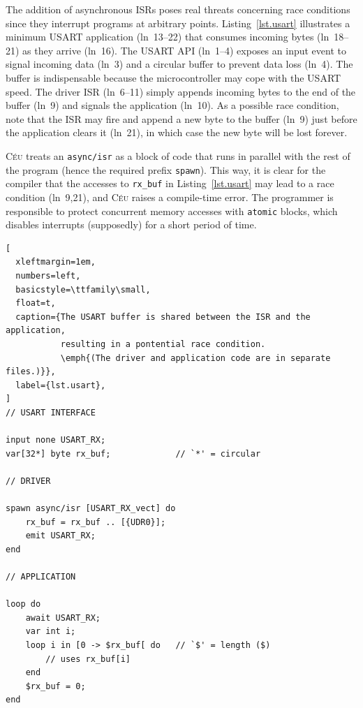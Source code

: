 \documentclass[sigplan,10pt,review,anonymous]{acmart}\settopmatter{printfolios=true,printccs=false,printacmref=false}
\newcommand{\CEU}{\textsc{C\'{e}u}\xspace}
\newcommand{\code}[1] {{\small{\texttt{#1}}}}
\begin{document}
The addition of asynchronous ISRs poses real threats concerning race conditions
since they interrupt programs at arbitrary points.
%
Listing~\ref{lst.usart} illustrates a minimum USART application (ln~13--22)
that consumes incoming bytes (ln~18--21) as they arrive (ln~16).
%
The USART API (ln~1--4) exposes an input event to signal incoming data (ln~3)
and a circular buffer to prevent data loss (ln~4).
The buffer is indispensable because the microcontroller may cope with the USART 
speed.
%
The driver ISR (ln~6--11) simply appends incoming bytes to the end of the
buffer (ln~9) and signals the application (ln~10).
%
As a possible race condition, note that the ISR may fire and append a new byte
to the buffer (ln~9) just before the application clears it (ln~21), in which
case the new byte will be lost forever.

\CEU treats an \code{async/isr} as a block of code that runs in parallel with
the rest of the program (hence the required prefix \code{spawn}).
%
This way, it is clear for the compiler that the accesses to \code{rx\_buf} in
Listing~\ref{lst.usart} may lead to a race condition (ln~9,21), and \CEU raises
a compile-time error.
%
The programmer is responsible to protect concurrent memory accesses with
\code{atomic} blocks, which disables interrupts (supposedly) for a short period
of time.

\begin{lstlisting}[
  xleftmargin=1em,
  numbers=left,
  basicstyle=\ttfamily\small,
  float=t,
  caption={The USART buffer is shared between the ISR and the application,
           resulting in a pontential race condition.
           \emph{(The driver and application code are in separate files.)}},
  label={lst.usart},
]
// USART INTERFACE

input none USART_RX;
var[32*] byte rx_buf;             // `*' = circular

// DRIVER

spawn async/isr [USART_RX_vect] do
    rx_buf = rx_buf .. [{UDR0}];
    emit USART_RX;
end

// APPLICATION

loop do
    await USART_RX;
    var int i;
    loop i in [0 -> $rx_buf[ do   // `$' = length ($)
        // uses rx_buf[i]
    end
    $rx_buf = 0;
end
\end{lstlisting}
\end{document}
